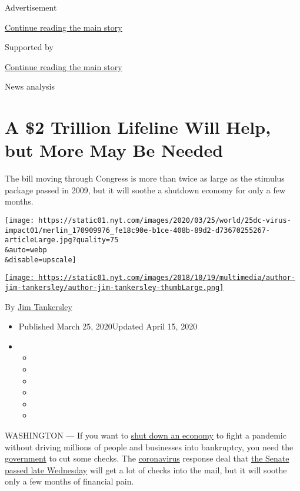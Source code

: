 Advertisement

\protect\hyperlink{after-top}{Continue reading the main story}

Supported by

\protect\hyperlink{after-sponsor}{Continue reading the main story}

News analysis

\hypertarget{a-2-trillion-lifeline-will-help-but-more-may-be-needed}{%
\section{A \$2 Trillion Lifeline Will Help, but More May Be
Needed}\label{a-2-trillion-lifeline-will-help-but-more-may-be-needed}}

The bill moving through Congress is more than twice as large as the
stimulus package passed in 2009, but it will soothe a shutdown economy
for only a few months.

\texttt{[image: https://static01.nyt.com/images/2020/03/25/world/25dc-virus-impact01/merlin\_170909976\_fe18c90e-b1ce-408b-89d2-d73670255267-articleLarge.jpg?quality=75\\\&auto=webp\\\&disable=upscale]}

\href{https://www.nytimes.com/by/jim-tankersley}{\texttt{[image: https://static01.nyt.com/images/2018/10/19/multimedia/author-jim-tankersley/author-jim-tankersley-thumbLarge.png]}}

By \href{https://www.nytimes.com/by/jim-tankersley}{Jim Tankersley}

\begin{itemize}
\item
  Published March 25, 2020Updated April 15, 2020
\item
  \begin{itemize}
  \item
  \item
  \item
  \item
  \item
  \item
  \end{itemize}
\end{itemize}

WASHINGTON --- If you want to
\href{https://www.nytimes.com/2020/03/22/us/politics/coronavirus-economy-shutdown.html}{shut
down an economy} to fight a pandemic without driving millions of people
and businesses into bankruptcy, you need the
\href{https://www.nytimes.com/2020/04/15/business/coronavirus-stimulus-money.html}{government}
to cut some checks. The
\href{https://www.nytimes.com/2020/04/15/business/coronavirus-stimulus-money.html}{coronavirus}
response deal that
\href{https://www.nytimes.com/2020/03/25/us/politics/coronavirus-senate-deal.html}{the
Senate passed late Wednesday} will get a lot of checks into the mail,
but it will soothe only a few months of financial pain.

